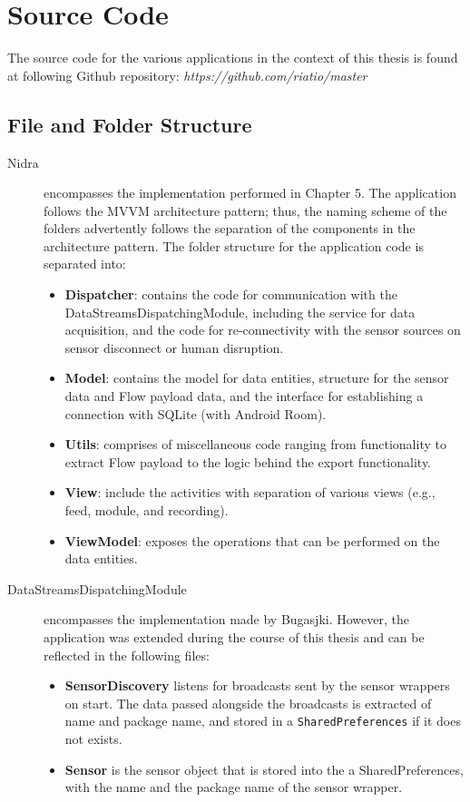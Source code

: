 \chapter{Source Code}
The source code for the various applications in the context of this thesis is found at following Github repository: \textit{https://github.com/riatio/master}

\section{File and Folder Structure}
\begin{description}
    \item[Nidra] encompasses the implementation performed in Chapter 5. The application follows the MVVM architecture pattern; thus, the naming scheme of the folders advertently follows the separation of the components in the architecture pattern. The folder structure for the application code is separated into:
    \begin{itemize}
        \item \textbf{Dispatcher}: contains the code for communication with the DataStreamsDispatchingModule, including the service for data acquisition, and the code for re-connectivity with the sensor sources on sensor disconnect or human disruption.
        \item \textbf{Model}: contains the model for data entities, structure for the sensor data and Flow payload data, and the interface for establishing a connection with SQLite (with Android Room).
        \item \textbf{Utils}: comprises of miscellaneous code ranging from functionality to extract Flow payload to the logic behind the export functionality. 
        \item \textbf{View}: include the activities with separation of various views (e.g., feed, module, and recording). 
        \item \textbf{ViewModel}: exposes the operations that can be performed on the data entities. 
    \end{itemize}

    \item[DataStreamsDispatchingModule] encompasses the implementation made by Bugasjki. However, the application was extended during the course of this thesis and can be reflected in the following files: 
    \begin{itemize}
        \item \textbf{SensorDiscovery} listens for broadcasts sent by the sensor wrappers on start. The data passed alongside the broadcasts is extracted of name and package name, and stored in a \verb|SharedPreferences| if it does not exists. 
        \item \textbf{Sensor} is the sensor object that is stored into the a SharedPreferences, with the name and the package name of the sensor wrapper. 
    \end{itemize}


\end{description}

